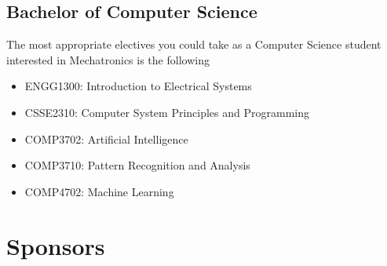 \documentclass[a4paper,12pt]{report}
\begin{document}
\section{Bachelor of Computer Science}
\vspace*{3mm}
The most appropriate electives you could take as a Computer Science student interested in Mechatronics is the following
\begin{multicols}{2}
    \begin{itemize}
        \item ENGG1300: Introduction to Electrical Systems
        \item CSSE2310: Computer System Principles and Programming
        \item COMP3702: Artificial Intelligence
        \item COMP3710: Pattern Recognition and Analysis
        \item COMP4702: Machine Learning
    \end{itemize}
\end{multicols}


\chapter{Sponsors} %
\end{document}
